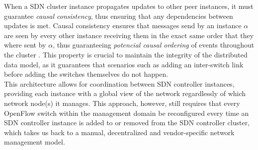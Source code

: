%
When a \gls{SDN} cluster instance propagates updates to other peer instances, it must guarantee \emph{causal consistency}, thus ensuring that any dependencies between updates is met.
Causal consistency ensures that messages send by an instance $\alpha$ are seen by every other instance receiving them in the exact same order that they where sent by $\alpha$, thus guaranteeing \emph{potencial causal ordering} of events throughout the cluster \cite{PADI}.
This property is crucial to maintain the integrity of the distributed data model, as it guarantees that scenarios such as adding an inter-switch link before adding the switches themselves do not happen.\\
%
This architecture allows for coordination between \gls{SDN} controller instances, providing each instance with a global view of the network regardlessly of which network node(s) it manages.
This approach, however, still requires that every OpenFlow switch within the management domain be reconfigured every time an \gls{SDN} controller instance is added to or removed from the \gls{SDN} controller cluster, which takes us back to a manual, decentralized and vendor-specific network management model.\\
%
